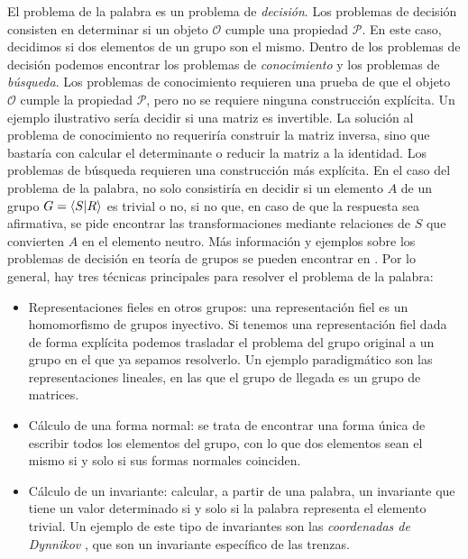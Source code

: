 \documentclass[TFG.tex]{subfiles}
\begin{document}
El problema de la palabra es un problema de \emph{decisión}. Los problemas de decisión consisten en determinar si un objeto $\mathcal{O}$ cumple una propiedad $\mathcal{P}$. En este caso, decidimos si dos elementos de un grupo son el mismo. Dentro de los problemas de decisión podemos encontrar los problemas de \emph{conocimiento} y los problemas de \emph{búsqueda}. Los problemas de conocimiento requieren una prueba de que el objeto $\mathcal{O}$ cumple la propiedad $\mathcal{P}$, pero no se requiere ninguna construcción explícita. Un ejemplo ilustrativo sería decidir si una matriz es invertible. La solución al problema de conocimiento no requeriría construir la matriz inversa, sino que bastaría con calcular el determinante o reducir la matriz a la identidad. Los problemas de búsqueda requieren una construcción más explícita. En el caso del problema de la palabra, no solo consistiría en decidir si un elemento $A$ de un grupo $G=\langle{S|R}\rangle$ es trivial o no, si no que, en caso de que la respuesta sea afirmativa, se pide encontrar las transformaciones mediante relaciones de $S$ que convierten $A$ en el elemento neutro. Más información y ejemplos sobre los problemas de decisión en teoría de grupos se pueden encontrar en \cite{problemas}.
\newpage
Por lo general, hay tres técnicas principales para resolver el problema de la palabra:
\begin{itemize}
\item Representaciones fieles en otros grupos: una representación fiel es un homomorfismo de grupos inyectivo. Si tenemos una representación fiel dada de forma explícita podemos trasladar el problema del grupo original a un grupo en el que ya sepamos resolverlo. Un ejemplo paradigmático son las representaciones lineales, en las que el grupo de llegada es un grupo de matrices. 
\item Cálculo de una forma normal:  se trata de encontrar una forma única de escribir todos los elementos del grupo, con lo que dos elementos sean el mismo si y solo si sus formas normales coinciden.
\item Cálculo de un invariante: calcular, a partir de una palabra, un invariante que tiene un valor determinado si y solo si la palabra representa el elemento trivial. Un ejemplo de este tipo de invariantes son las \emph{coordenadas de Dynnikov} \cite{Dynnikov}, que son un invariante específico de las trenzas.
\end{itemize} 
\end{document}
